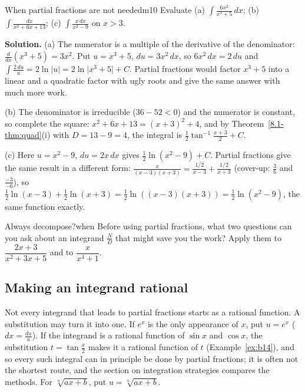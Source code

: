 \documentclass[11pt]{article}
\begin{document}
\begin{exmp}{When partial fractions are not needed}{m10}
Evaluate (a) $\displaystyle\int\frac{6x^2}{x^3+5}\,dx$; (b) $\displaystyle\int\frac{dx}{x^2+6x+13}$; (c) $\displaystyle\int\frac{x\,dx}{x^2-9}$ on $x>3$.

\textbf{Solution.} (a) The numerator is a multiple of the derivative of the denominator: $\frac d{dx}(x^3+5)=3x^2$. Put $u=x^3+5$, $du=3x^2\,dx$, so $6x^2\,dx=2\,du$ and $\int\frac{2\,du}u=2\ln\lvert u\rvert=2\ln\lvert x^3+5\rvert+C$. Partial fractions would factor $x^3+5$ into a linear and a quadratic factor with ugly roots and give the same answer with much more work.

(b) The denominator is irreducible ($36-52<0$) and the numerator is constant, so complete the square: $x^2+6x+13=(x+3)^2+4$, and by Theorem~\ref{8.1-thm:quad}(i) with $D=13-9=4$, the integral is $\frac12\tan^{-1}\frac{x+3}2+C$.

(c) Here $u=x^2-9$, $du=2x\,dx$ gives $\frac12\ln(x^2-9)+C$. Partial fractions give the same result in a different form: $\frac x{(x-3)(x+3)}=\frac{1/2}{x-3}+\frac{1/2}{x+3}$ (cover-up: $\frac3{6}$ and $\frac{-3}{-6}$), so $\frac12\ln(x-3)+\frac12\ln(x+3)=\frac12\ln\left((x-3)(x+3)\right)=\frac12\ln(x^2-9)$, the same function exactly.
\end{exmp}

\begin{think}{Always decompose?}{when}
Before using partial fractions, what two questions can you ask about an integrand $\frac ND$ that might save you the work? Apply them to $\dfrac{2x+3}{x^2+3x+5}$ and to $\dfrac{x}{x^4+1}$.
\end{think}

\subsection*{Making an integrand rational}

Not every integrand that leads to partial fractions starts as a rational function. A substitution may turn it into one. If $e^x$ is the only appearance of $x$, put $u=e^x$ ($dx=\frac{du}u$). If the integrand is a rational function of $\sin x$ and $\cos x$, the substitution $t=\tan\frac x2$ makes it a rational function of $t$ (Example~\ref{ex:b14}), and so every such integral can in principle be done by partial fractions; it is often not the shortest route, and the section on integration strategies compares the methods. For $\sqrt[n]{ax+b}$, put $u=\sqrt[n]{ax+b}$.
\end{document}
